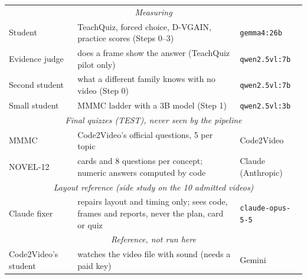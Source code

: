 \begin{table}[t]
\begin{tabular}{@{}lp{9.2cm}l@{}}
\midrule
\multicolumn{3}{c}{\textit{Measuring}}\\
Student & TeachQuiz, forced choice, D-VGAIN, practice scores (Steps 0--3) & \texttt{gemma4:26b} \\
Evidence judge & does a frame show the answer (TeachQuiz pilot only) & \texttt{qwen2.5vl:7b} \\
Second student & what a different family knows with no video (Step 0) & \texttt{qwen2.5vl:7b} \\
Small student & MMMC ladder with a 3B model (Step 1) & \texttt{qwen2.5vl:3b} \\
\midrule
\multicolumn{3}{c}{\textit{Final quizzes (TEST), never seen by the pipeline}}\\
MMMC & Code2Video's official questions, 5 per topic & Code2Video \\
NOVEL-12 & cards and 8 questions per concept; numeric answers computed by code & Claude (Anthropic) \\
\midrule
\multicolumn{3}{c}{\textit{Layout reference (side study on the 10 admitted videos)}}\\
Claude fixer & repairs layout and timing only; sees code, frames and reports, never the plan, card or quiz & \texttt{claude-opus-5-5} \\
\midrule
\multicolumn{3}{c}{\textit{Reference, not run here}}\\
Code2Video's student & watches the video file with sound (needs a paid key) & Gemini \\
\bottomrule\end{tabular}
\end{table}

